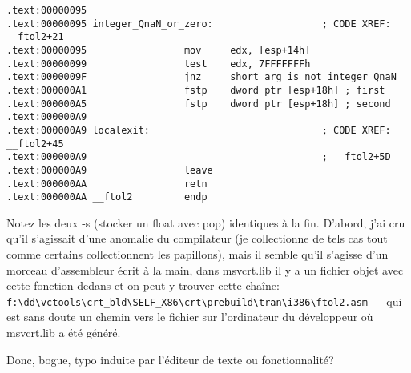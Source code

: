 \begin{lstlisting}
.text:00000095
.text:00000095 integer_QnaN_or_zero:                   ; CODE XREF: __ftol2+21
.text:00000095                 mov     edx, [esp+14h]
.text:00000099                 test    edx, 7FFFFFFFh
.text:0000009F                 jnz     short arg_is_not_integer_QnaN
.text:000000A1                 fstp    dword ptr [esp+18h] ; first
.text:000000A5                 fstp    dword ptr [esp+18h] ; second
.text:000000A9
.text:000000A9 localexit:                              ; CODE XREF: __ftol2+45
.text:000000A9                                         ; __ftol2+5D
.text:000000A9                 leave
.text:000000AA                 retn
.text:000000AA __ftol2         endp
\end{lstlisting}

Notez les deux  -s (stocker un float avec pop) identiques à la fin.
D'abord, j'ai cru qu'il s'agissait d'une anomalie du compilateur (je collectionne
de tels cas tout comme certains collectionnent les papillons), mais il semble qu'il
s'agisse d'un morceau d'assembleur écrit à la main, dans msvcrt.lib il y a un fichier
objet avec cette fonction dedans et on peut y trouver cette chaîne:
\verb|f:\dd\vctools\crt_bld\SELF_X86\crt\prebuild\tran\i386\ftol2.asm| ---
qui est sans doute un chemin vers le fichier sur l'ordinateur du développeur où
msvcrt.lib a été généré.

Donc, bogue, typo induite par l'éditeur de texte ou fonctionnalité?

